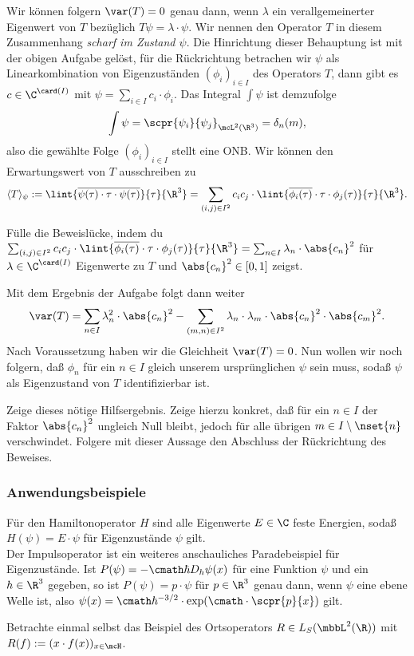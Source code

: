 \documentclass{subfiles}
\begin{document}
    Wir können folgern $\var(T) = 0$ genau dann, wenn $\lambda$ ein verallgemeinerter Eigenwert von $T$ bezüglich $T\psi = \lambda\cdot\psi$. Wir nennen den Operator $T$ in diesem Zusammenhang \emph{scharf im Zustand $\psi$}. Die Hinrichtung dieser Behauptung ist mit der obigen Aufgabe gelöst, für die Rückrichtung betrachen wir $\psi$ als Linearkombination von Eigenzuständen $(\phi_i)_{i\in I}$ des Operators $T$, dann gibt es $c\in\C^{\card(I)}$ mit $\psi = \sum_{i\in I}c_i\cdot\phi_i$. Das Integral $\int\psi$ ist demzufolge
    \[\int\psi = \scpr{\psi_i}{\psi_j}_{\mcL^2(\R^3)} = \delta_{n}(m),\]
    also die gewählte Folge $(\phi_i)_{i\in I}$ stellt eine ONB. Wir können den Erwartungswert von $T$ ausschreiben zu 
    \[\langle T\rangle_\psi := \lint{\overline{\psi(\tau)\cdot\tau\cdot\psi(\tau)}}{\tau}{\R^3} = \sum_{(i,j)\in I^2}c_ic_j\cdot\lint{\overline{\phi_i(\tau)}\cdot\tau\cdot\phi_j(\tau)}{\tau}{\R^3}.\]
    \begin{Aufgabe}
        \nr{} Fülle die Beweislücke, indem du $\sum_{(i,j)\in I^2}c_ic_j\cdot\lint{\overline{\phi_i(\tau)}\cdot\tau\cdot\phi_j(\tau)}{\tau}{\R^3} = \sum_{n\in I}\lambda_n\cdot\abs{c_n}^2$ für $\lambda\in\C^{\card(I)}$ Eigenwerte zu $T$ und $\abs{c_n}^2\in[0,1]$ zeigst. 
    \end{Aufgabe}
    Mit dem Ergebnis der Aufgabe folgt dann weiter
    \[\var(T) = \sum_{n\in I}\lambda_n^2\cdot\abs{c_n}^2 - \sum_{(m,n)\in I^2}\lambda_n\cdot\lambda_m\cdot\abs{c_n}^2\cdot\abs{c_m}^2.\]
    Nach Voraussetzung haben wir die Gleichheit $\var(T) = 0$. Nun wollen wir noch folgern, daß $\phi_n$ für ein $n\in I$ gleich unserem ursprünglichen $\psi$ sein muss, sodaß $\psi$ als Eigenzustand von $T$ identifizierbar ist. 
    \begin{Aufgabe}
        \nr{} Zeige dieses nötige Hilfsergebnis. Zeige hierzu konkret, daß für ein $n\in I$ der Faktor $\abs{c_n}^2$ ungleich Null bleibt, jedoch für alle übrigen $m\in I\setminus\nset{n}$ verschwindet. Folgere mit dieser Aussage den Abschluss der Rückrichtung des Beweises.
    \end{Aufgabe}

    \subsubsection*{Anwendungsbeispiele}
        Für den Hamiltonoperator $H$ sind alle Eigenwerte $E\in\C$ feste Energien, sodaß $H(\psi)=E\cdot\psi$ für Eigenzustände $\psi$ gilt. \\

        Der Impulsoperator ist ein weiteres anschauliches Paradebeispiel für Eigenzustände. Ist $P(\psi) = -\cmath\hbar D_h\psi(x)$ für eine Funktion $\psi$ und ein $h\in\R^3$ gegeben, so ist $P(\psi) = p\cdot\psi$ für $p\in\R^3$ genau dann, wenn $\psi$ eine ebene Welle ist, also $\psi(x) = \cmath\hbar^{-3/2}\cdot\exp(\cmath\cdot\scpr{p}{x})$ gilt. 
        \begin{Aufgabe}
            \nr{} Betrachte einmal selbst das Beispiel des Ortsoperators $R\in L_S(\mbbL^2(\R))$ mit $R(f):=(x\cdot f(x))_{x\in\mcH}$. 
        \end{Aufgabe}
\end{document}
